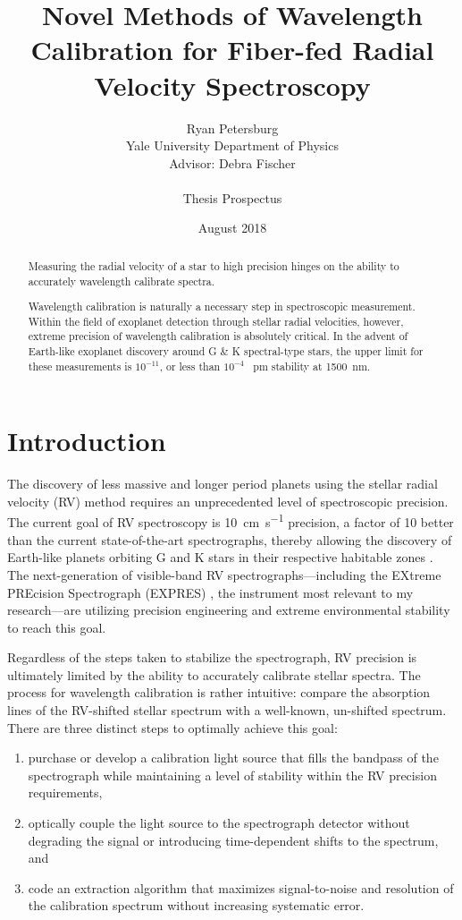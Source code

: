 \documentclass[11pt]{article}
\title{Novel Methods of Wavelength Calibration for Fiber-fed Radial Velocity Spectroscopy}
\author{Ryan Petersburg\\
Yale University Department of Physics\\
Advisor: Debra Fischer\\
\\
Thesis Prospectus}
\date{August 2018}
\begin{document}
\maketitle

\begin{abstract}

Measuring the radial velocity of a star to high precision hinges on the ability to accurately wavelength calibrate spectra.


Wavelength calibration is naturally a necessary step in spectroscopic measurement. Within the field of exoplanet detection through stellar radial velocities, however, extreme precision of wavelength calibration is absolutely critical. In the advent of Earth-like exoplanet discovery around G \& K spectral-type stars, the upper limit for these measurements is $10^{-11}$, or less than $10^{-4}$ \SI{}{\pico\meter} stability at \SI{1500}{\nano\meter}.

\end{abstract}

\pagebreak

\section{Introduction}

The discovery of less massive and longer period planets using the stellar radial velocity (RV) method requires an unprecedented level of spectroscopic precision. The current goal of RV spectroscopy is \SI{10}{\centi\meter\per\second} precision, a factor of 10 better than the current state-of-the-art spectrographs, thereby allowing the discovery of Earth-like planets orbiting G and K stars in their respective habitable zones \cite{Fischer2016}. The next-generation of visible-band RV spectrographs---including the EXtreme PREcision Spectrograph (EXPRES) \cite{Jurgenson2016}, the instrument most relevant to my research---are utilizing precision engineering and extreme environmental stability to reach this goal.

Regardless of the steps taken to stabilize the spectrograph, RV precision is ultimately limited by the ability to accurately calibrate stellar spectra. The process for wavelength calibration is rather intuitive: compare the absorption lines of the RV-shifted stellar spectrum with a well-known, un-shifted spectrum. There are three distinct steps to optimally achieve this goal:
\begin{enumerate}
    \item purchase or develop a calibration light source that fills the bandpass of the spectrograph while maintaining a level of stability within the RV precision requirements,
    \item optically couple the light source to the spectrograph detector without degrading the signal or introducing time-dependent shifts to the spectrum, and
    \item code an extraction algorithm that maximizes signal-to-noise and resolution of the calibration spectrum without increasing systematic error.
\end{enumerate}
\end{document}
